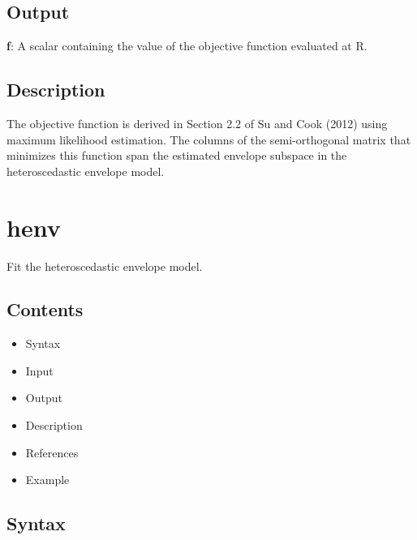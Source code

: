 \documentclass[a4paper,11pt,openany]{memoir}
\begin{document}
\subsection*{Output}

\begin{par}
\textbf{f}: A scalar containing the value of the objective function evaluated at R.
\end{par} \vspace{1em}


\subsection*{Description}

\begin{par}
The objective function is derived in Section 2.2 of Su and Cook (2012)  using maximum likelihood estimation. The columns of the semi-orthogonal matrix that minimizes this function span the estimated envelope subspace in the heteroscedastic envelope model.
\end{par} \vspace{1em}
\newpage


    
\rmfamily
\color{black}\section{henv}

\begin{par}
Fit the heteroscedastic envelope model.
\end{par} \vspace{1em}

\subsection*{Contents}

\begin{itemize}
\setlength{\itemsep}{-1ex}
   \item Syntax
   \item Input
   \item Output
   \item Description
   \item References
   \item Example
\end{itemize}


\subsection*{Syntax}
\end{document}
